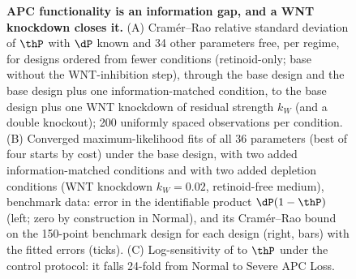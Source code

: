 \begin{figure}[tbp]
\centering
{}
\caption{\textbf{APC functionality is an information gap, and a WNT knockdown
closes it.} (A) Cram\'er--Rao relative standard deviation of $\thP$ with $\dP$
known and 34 other parameters free, per regime, for designs ordered from fewer
conditions (retinoid-only; base without the WNT-inhibition step), through the
base design and the base design plus one information-matched condition, to the
base design plus one WNT knockdown of residual strength $k_W$ (and a \bcat{}
double knockout); 200 uniformly spaced observations per condition. (B)
Converged maximum-likelihood fits of all 36 parameters (best of four starts by
cost) under the base design, with two added information-matched conditions and
with two added depletion conditions (WNT knockdown $k_W=0.02$, retinoid-free
medium), benchmark data: error in the identifiable product $\dP(1-\thP)$ (left;
zero by construction in Normal), and its Cram\'er--Rao bound on the 150-point
benchmark design for each design (right, bars) with the fitted errors (ticks). (C) Log-sensitivity of
\bcat{} to $\thP$ under the control protocol: it falls 24-fold from Normal to
Severe APC Loss.}
\label{fig:thetaP}
\end{figure}
